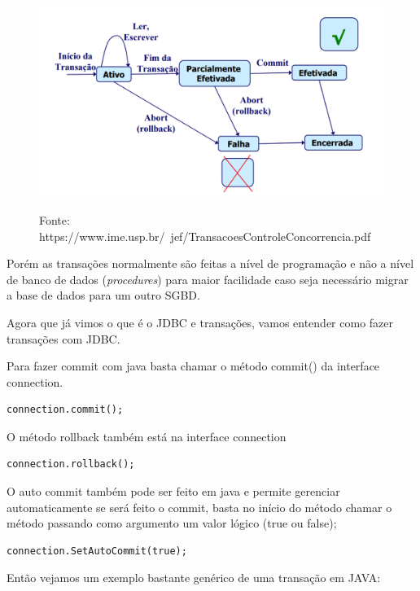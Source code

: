 \documentclass[12pt,a4paper]{article}
\begin{document}
\begin{figure}[h!]
\centering
\includegraphics[width=15cm]{recursos/imagens/commit_rollback.png}
\label{4}
\caption{Fonte: https://www.ime.usp.br/~jef/TransacoesControleConcorrencia.pdf}
\end{figure} 


Porém as transações normalmente são feitas a nível de programação e não a nível de banco de dados (\textit{procedures}) para maior facilidade caso seja necessário migrar a base de dados para um outro SGBD. 

Agora que já vimos o que é o JDBC e transações, vamos entender como fazer transações com JDBC.

Para fazer commit com java basta chamar o método commit() da interface connection.

\begin{lstlisting}
connection.commit();
\end{lstlisting}

O método rollback também está na interface connection

\begin{lstlisting}
connection.rollback();
\end{lstlisting}

O auto commit também pode ser feito em java e permite gerenciar automaticamente se será feito o commit, basta no início do método chamar o método passando como argumento um valor lógico (true ou false);

\begin{lstlisting}
connection.SetAutoCommit(true);
\end{lstlisting}

Então vejamos um exemplo bastante genérico de uma transação em JAVA:


 
\end{document}
